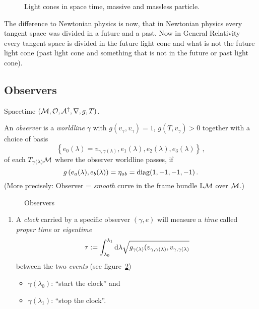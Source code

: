 \begin{figure}[tbh]
    \centering\def\svgwidth{\columnwidth}
    
    \caption{Light cones in space time, massive and massless particle.}
    \label{fig:spacetimeLightCones}
\end{figure}
\begin{note}
    The difference to Newtonian physics is now, that in Newtonian physics every tangent space was
    divided in a future and a past. 
    Now in General Relativity every tangent space is divided in the future light cone
    and what is not the future light cone (past light cone and something that is not in the
    future or past light cone).
\end{note}

\subsection{Observers}
Spacetime $(\mathcal{M}, \mathcal{O}, \mathcal{A}^\uparrow, \nabla, g, T)$.
\begin{defn}[Observer]
    An \textit{observer} is a \textit{worldline} $\gamma$ with
    $g(v_\gamma, v_\gamma) = 1$, $g(T, v_\gamma)>0$
    together with a choice of basis
    \begin{equation}
        \left\{ e_0(\lambda) = v_{\gamma,\gamma(\lambda)}, e_1(\lambda), e_2(\lambda), e_3(\lambda) \right\}\,,
    \end{equation}
    of each $T_{\gamma(\lambda)}\mathcal{M}$ where the observer worldline passes,
    if
    \begin{equation}
        g\left( e_a(\lambda), e_b(\lambda) \right) = \eta_{ab} = \operatorname{diag}(1, -1, -1, -1)\,.
    \end{equation}
    (More precisely: Observer = \textit{smooth} curve in the frame bundle
    $\mathrm{L}\mathcal{M}$ over $\mathcal{M}$.)
\end{defn}

\begin{figure}[tbh]
    \centering\def\svgwidth{\columnwidth}
    
    \caption{Observers}
    \label{fig:observers}
\end{figure}

\begin{enumerate}[resume, label=(\subscript{P}{{\arabic*}})]
    \item A \textit{clock} carried by a specific observer $(\gamma, e)$ will measure a
        \textit{time} called \textit{proper time} or \textit{eigentime}
        \begin{equation}
            \tau := \int_{\lambda_0}^{\lambda_1} \operatorname{d\!} \lambda \sqrt{g_{\gamma(\lambda)}(v_{\gamma, \gamma(\lambda)}, v_{\gamma, \gamma(\lambda)}}
            \end{equation}
            between the two \textit{events} (see figure~\ref{fig:observers})
            \begin{itemize}
                \item $\gamma(\lambda_0)$: ``start the clock'' and
                \item $\gamma(\lambda_1)$: ``stop the clock''.
            \end{itemize}
            \label{item:clock}
\end{enumerate}
